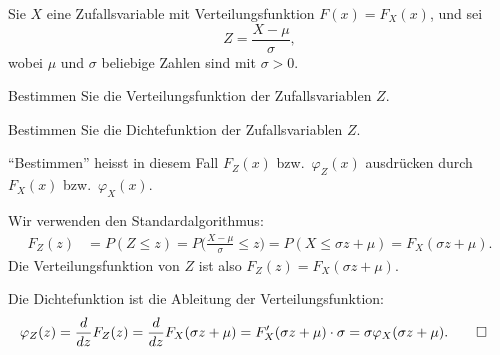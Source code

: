 Sie $X$ eine Zufallsvariable mit Verteilungsfunktion $F(x)=F_X(x)$, und
sei\[
Z=\frac{X-\mu}{\sigma},
\]
wobei $\mu$ und $\sigma$ beliebige Zahlen sind mit $\sigma > 0$.

\begin{teilaufgaben}
\item Bestimmen Sie die Verteilungsfunktion der Zufallsvariablen $Z$.
\item Bestimmen Sie die Dichtefunktion der Zufallsvariablen $Z$.
\end{teilaufgaben}
\begin{hinweis}
``Bestimmen'' heisst in diesem Fall $F_Z(x)$ bzw.~$\varphi_Z(x)$ ausdrücken durch
$F_X(x)$ bzw.~$\varphi_X(x)$.
\end{hinweis}

\begin{loesung}
\begin{teilaufgaben}
\item Wir verwenden den Standardalgorithmus:
\begin{align*}
F_Z(z)&=P(Z\le z)
=P\biggl(\frac{X-\mu}{\sigma}\le z\biggr)
=P(X\le \sigma z+\mu)=F_X(\sigma z+\mu).
\end{align*}
Die Verteilungsfunktion von $Z$ ist also $F_Z(z)=F_X(\sigma z+\mu)$.
\item Die Dichtefunktion ist die Ableitung der Verteilungsfunktion:
\begin{align*}
\varphi_Z(z)&=\frac{d}{dz}F_Z(z)
=\frac{d}{dz}F_X(\sigma z+ \mu)
=F_X'(\sigma z+ \mu)\cdot \sigma=\sigma\varphi_X(\sigma z+\mu).
\qedhere
\end{align*}
\end{teilaufgaben}
\end{loesung}

